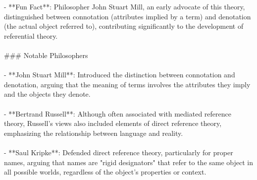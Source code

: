 \documentclass[a4paper,12pt,single,pdftex]{scrbook}
\begin{document}
    
      - **Fun Fact**: Philosopher John Stuart Mill, an early advocate of this theory, distinguished between connotation (attributes implied by a term) and denotation (the actual object referred to), contributing significantly to the development of referential theory.
    \\

    
      
    \\

    
      \#\#\# Notable Philosophers
    \\

    
      
    \\

    
      - **John Stuart Mill**: Introduced the distinction between connotation and denotation, arguing that the meaning of terms involves the attributes they imply and the objects they denote.
    \\

    
      
    \\

    
      - **Bertrand Russell**: Although often associated with mediated reference theory, Russell's views also included elements of direct reference theory, emphasizing the relationship between language and reality.
    \\

    
      
    \\

    
      - **Saul Kripke**: Defended direct reference theory, particularly for proper names, arguing that names are "rigid designators" that refer to the same object in all possible worlds, regardless of the object's properties or context.
    \\
\end{document}
